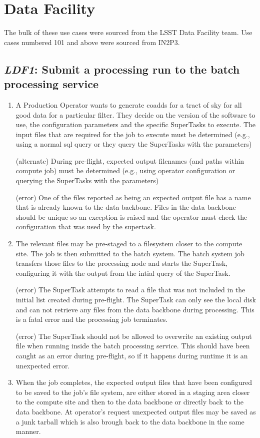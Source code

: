 \documentclass[DM,toc,lsstdraft]{lsstdoc}
\newcommand{\usecase}[3]{%
\subsection{\emph{#1}: #2}
\label{use:#1}
\begin{enumerate}[label=\alph*.]
#3
\end{enumerate}
}
\begin{document}
\section{Data Facility}

The bulk of these use cases were sourced from the LSST Data Facility team.
Use cases numbered 101 and above were sourced from IN2P3.

\usecase{LDF1}{Submit a processing run to the batch processing service}{%

\item
A Production Operator wants to generate coadds for a tract of sky for all good data for a particular filter.
They decide on the version of the software to use, the configuration parameters and the specific SuperTasks to execute.
The input files that are required for the job to execute must be determined (e.g., using a normal sql query or they query the SuperTasks with the parameters)

(alternate)
During pre-flight, expected output filenames (and paths within compute job) must be determined (e.g., using operator configuration or querying the SuperTasks with the parameters)

(error)
One of the files reported as being an expected output file has a name that is already known to the data backbone.
Files in the data backbone should be unique so an exception is raised and the operator must check the configuration that was used by the supertask.

\item
The relevant files may be pre-staged to a filesystem closer to the compute site.
The job is then submitted to the batch system.
The batch system job transfers those files to the processing node and starts the SuperTask, configuring it with the output from the intial query of the SuperTask.

(error)
The SuperTask attempts to read a file that was not included in the initial list created during pre-flight.
The SuperTask can only see the local disk and can not retrieve any files from the data backbone during processing.
This is a fatal error and the processing job terminates.

(error)
The SuperTask should not be allowed to overwrite an existing output file when running inside the batch processing service.
This should have been caught as an error during pre-flight, so if it happens during runtime it is an unexpected error.

\item
When the job completes, the expected output files that have been configured to be saved to the job's file system, are either stored in a staging area closer to the compute site and then to the data backbone or directly back to the data backbone.
At operator's request unexpected output files may be saved as a junk tarball which is also brough back to the data backbone in the same manner.

}
\end{document}
